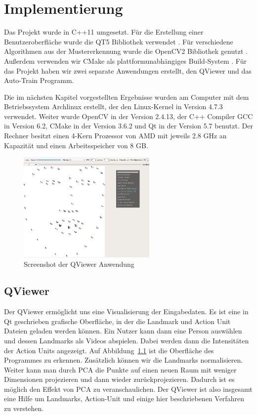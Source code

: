 \chapter{Implementierung}\label{ch:implementierung}
Das Projekt wurde in C++11 umgesetzt. Für die Erstellung einer Benutzeroberfläche wurde die QT5 Bibliothek verwendet \cite{qt5}.
Für verschiedene Algorithmen aus der Mustererkennung wurde die OpenCV2 Bibliothek genutzt \cite{opencv}. Außerdem verwenden wir CMake
als plattformunabhängiges Build-System \cite{cmake}. Für das Projekt haben wir zwei separate Anwendungen erstellt, den QViewer und das Auto-Train
Programm.

Die im nächsten Kapitel vorgestellten Ergebnisse wurden am Computer mit dem Betriebssystem Archlinux erstellt, der den Linux-Kernel in Version 4.7.3 verwendet. Weiter wurde OpenCV in der Version 2.4.13, der C++ Compiler GCC in Version 6.2, CMake in der Version 3.6.2 und Qt in der Version 5.7 benutzt. Der Rechner besitzt einen 4-Kern Prozessor von AMD mit jeweils 2.8 GHz an Kapazität und einen Arbeitsspeicher von 8 GB. 

\begin{figure}[ht]
\begin{center}
\includegraphics[width=0.6\textwidth]{qviewer.png}
\end{center}
\caption{Screenshot der QViewer Anwendung}
\label{fig:implementierung.QViewer}
\end{figure}

\section{QViewer}
Der QViewer ermöglicht uns eine Visualisierung der Eingabedaten.
Es ist eine in Qt geschrieben grafische Oberfläche, in der
die Landmark und Action Unit Dateien geladen werden können. 
Ein Nutzer kann dann eine Person auswählen und dessen Landmarks als Videos abspielen.
Dabei werden dann die Intensitäten der Action Units angezeigt. Auf Abbildung~\ref{fig:implementierung.QViewer} ist die Oberfläche des Programmes zu erkennen.
Zusätzlich können wir die Landmarks normalisieren. Weiter kann man durch PCA die Punkte auf einen neuen Raum mit weniger Dimensionen projezieren und dann wieder zurückprojezieren. Dadurch ist es möglich den Effekt von PCA zu veranschaulichen.
Der QViewer ist also insgesamt eine Hilfe um Landmarks, Action-Unit und einige hier beschriebenen Verfahren zu verstehen.



